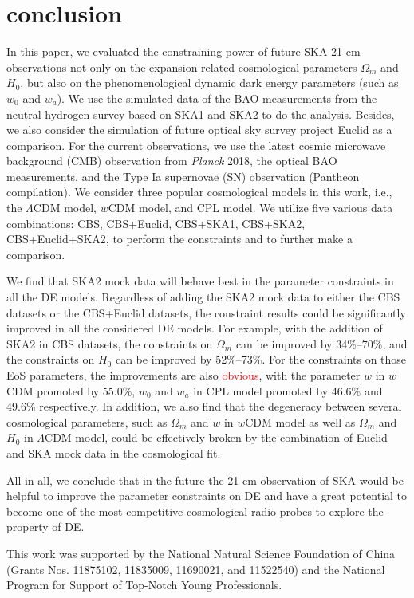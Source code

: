 \documentclass[aps,prd,amsmath,amssymb,showpacs,floats,floatfix,nofootinbib,reprint]{revtex4-1}
\def\red#1{{\textcolor{red}{#1}}} %
\begin{document}
\section{conclusion}
In this paper, we evaluated the constraining power of future SKA 21 cm observations not only on the expansion related cosmological parameters $\Omega_{m}$ and $H_{0}$, but also on the phenomenological dynamic dark energy parameters (such as $w_{0}$ and $w_{a}$). We use the simulated data of the BAO measurements from the neutral hydrogen survey based on SKA1 and SKA2 to do the analysis. Besides, we also consider the simulation of future optical sky survey project Euclid as a comparison. For the current observations, we use the latest cosmic microwave background (CMB) observation from {\it Planck} 2018, the optical BAO measurements, and the Type Ia supernovae (SN) observation (Pantheon compilation).  We consider three popular cosmological models in this work, i.e., the $\Lambda$CDM model, $w$CDM model, and CPL model. We utilize five various data combinations: CBS, CBS+Euclid, CBS+SKA1, CBS+SKA2, CBS+Euclid+SKA2, to perform the constraints and to further make a comparison.

We find that SKA2 mock data will behave best in the parameter constraints in all the DE models. Regardless of adding the SKA2 mock data to either the CBS datasets or the CBS+Euclid datasets, the constraint results could be significantly improved in all the considered DE models. For example, with the addition of SKA2 in CBS datasets, the constraints on $\Omega_{m}$ can be improved by 34\%--70\%, and the constraints on $H_{0}$ can be improved by 52\%--73\%. For the constraints on those EoS parameters, the improvements are also \red{obvious}, with the parameter $w$ in $w$CDM promoted by 55.0\%, $w_0$ and $w_a$ in CPL model promoted by 46.6\% and 49.6\% respectively. In addition, we also find that the degeneracy between several cosmological parameters, such as $\Omega_m$ and $w$ in $w$CDM model as well as $\Omega_m$ and $H_0$ in $\Lambda$CDM model, could be effectively broken by the combination of Euclid and SKA mock data in the cosmological fit.

All in all, we conclude that in the future the 21 cm observation of SKA would be helpful to improve the parameter constraints on DE and have a great potential to become one of the most competitive cosmological radio probes to explore the property of DE.
\begin{acknowledgments}
This  work  was  supported  by  the  National  Natural Science  Foundation  of  China  (Grants  Nos.  11875102, 11835009, 11690021, and 11522540)  and  the  National Program for Support of Top-Notch Young Professionals.
\end{acknowledgments}
\end{document}

